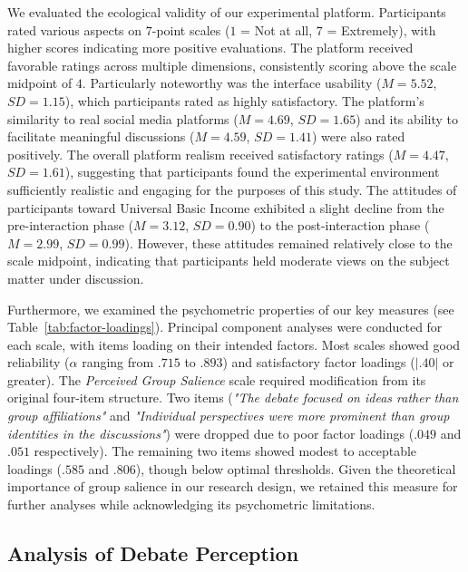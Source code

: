 We evaluated the ecological validity of our experimental platform. Participants rated various aspects on $7$-point scales ($1$ = Not at all, $7$ = Extremely), with higher scores indicating more positive evaluations. The platform received favorable ratings across multiple dimensions, consistently scoring above the scale midpoint of $4$. Particularly noteworthy was the interface usability ($M = 5.52$, $SD = 1.15$), which participants rated as highly satisfactory. The platform's similarity to real social media platforms ($M = 4.69$, $SD = 1.65$) and its ability to facilitate meaningful discussions ($M = 4.59$, $SD = 1.41$) were also rated positively. The overall platform realism received satisfactory ratings ($M = 4.47$, $SD = 1.61$), suggesting that participants found the experimental environment sufficiently realistic and engaging for the purposes of this study. The attitudes of participants toward Universal Basic Income exhibited a slight decline from the pre-interaction phase ($M = 3.12$, $SD = 0.90$) to the post-interaction phase ($M = 2.99$, $SD = 0.99$). However, these attitudes remained relatively close to the scale midpoint, indicating that participants held moderate views on the subject matter under discussion.




Furthermore, we examined the psychometric properties of our key measures (see Table~\ref{tab:factor-loadings}). Principal component analyses were conducted for each scale, with items loading on their intended factors. Most scales showed good reliability ($\alpha$ ranging from $.715$ to $.893$) and satisfactory factor loadings ($|.40|$ or greater). The \emph{Perceived Group Salience} scale required modification from its original four-item structure. Two items (\emph{"The debate focused on ideas rather than group affiliations"} and \emph{"Individual perspectives were more prominent than group identities in the discussions"}) were dropped due to poor factor loadings ($.049$ and $.051$ respectively). The remaining two items showed modest to acceptable loadings ($.585$ and $.806$), though below optimal thresholds. Given the theoretical importance of group salience in our research design, we retained this measure for further analyses while acknowledging its psychometric limitations.


\subsection{Analysis of Debate Perception}
\label{subsec:debate-perception}

